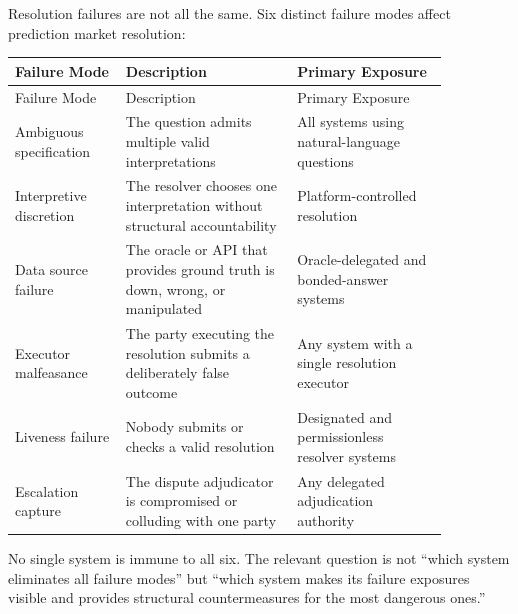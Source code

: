 \documentclass[10pt]{article}
\begin{document}
Resolution failures are not all the same. Six distinct failure modes affect prediction market resolution:

\begin{center}
\setlength{\LTleft}{0pt}
\setlength{\LTright}{0pt}
\setlength{\tabcolsep}{4pt}
\renewcommand{\arraystretch}{1.15}
\footnotesize
\begin{longtable}{@{}>{\raggedright\arraybackslash}p{0.22\linewidth} >{\raggedright\arraybackslash}p{0.34\linewidth} >{\raggedright\arraybackslash}p{0.30\linewidth}@{}}
\toprule
Failure Mode & Description & Primary Exposure \\
\midrule
\endfirsthead
\toprule
Failure Mode & Description & Primary Exposure \\
\midrule
\endhead
Ambiguous specification & The question admits multiple valid interpretations & All systems using natural-language questions \\
Interpretive discretion & The resolver chooses one interpretation without structural accountability & Platform-controlled resolution \\
Data source failure & The oracle or API that provides ground truth is down, wrong, or manipulated & Oracle-delegated and bonded-answer systems \\
Executor malfeasance & The party executing the resolution submits a deliberately false outcome & Any system with a single resolution executor \\
Liveness failure & Nobody submits or checks a valid resolution & Designated and permissionless resolver systems \\
Escalation capture & The dispute adjudicator is compromised or colluding with one party & Any delegated adjudication authority \\
\bottomrule
\end{longtable}
\end{center}
\normalsize
\setlength{\tabcolsep}{6pt}

No single system is immune to all six. The relevant question is not ``which system eliminates all failure modes'' but ``which system makes its failure exposures visible and provides structural countermeasures for the most dangerous ones.''
\end{document}

